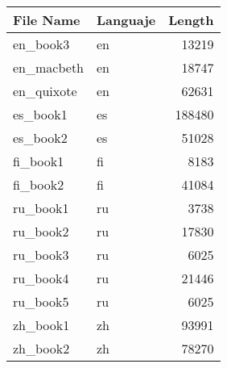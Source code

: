 \begin{tabular}{llr}
\toprule
File Name & Languaje & Length \\
\midrule
en_book3 & en & 13219 \\
en_macbeth & en & 18747 \\
en_quixote & en & 62631 \\
es_book1 & es & 188480 \\
es_book2 & es & 51028 \\
fi_book1 & fi & 8183 \\
fi_book2 & fi & 41084 \\
ru_book1 & ru & 3738 \\
ru_book2 & ru & 17830 \\
ru_book3 & ru & 6025 \\
ru_book4 & ru & 21446 \\
ru_book5 & ru & 6025 \\
zh_book1 & zh & 93991 \\
zh_book2 & zh & 78270 \\
\bottomrule
\end{tabular}
